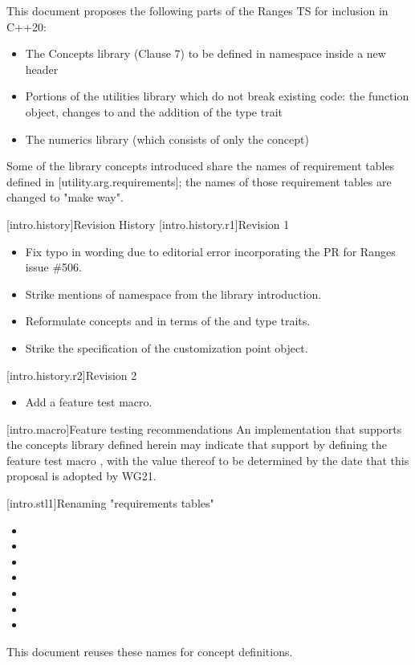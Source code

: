 This document proposes the following parts of the Ranges TS for inclusion in C++20:
\begin{itemize}
\item The Concepts library (Clause 7) to be defined in namespace  inside
  a new  header
\item Portions of the utilities library which do not break existing code: the
   function object, changes to   and the
  addition of the  type trait
\item The numerics library (which consists of only the
   concept)
\end{itemize}
Some of the library concepts introduced share the names of requirement tables
defined in [utility.arg.requirements]; the names of those requirement tables are
changed to "make way".

[intro.history]{Revision History}
[intro.history.r1]{Revision 1}
\begin{itemize}
\item Fix typo in  wording due to editorial error
  incorporating the PR for Ranges issue \#506.
\item Strike mentions of namespace  from the library introduction.
\item Reformulate concepts  and  in terms
  of the  and  type traits.
\item Strike the specification of the  customization point object.
\end{itemize}
[intro.history.r2]{Revision 2}
\begin{itemize}
\item Add a feature test macro.
\end{itemize}

[intro.macro]{Feature testing recommendations}
An implementation that supports the concepts library defined herein may indicate
that support by defining the feature test macro , with
the value thereof to be determined by the date that this proposal is adopted by
WG21.

[intro.stl1]{Renaming "requirements tables"}

\pnum
{}
\begin{itemize}
\item {}
\item {}
\item {}
\item {}
\item {}
\item {}
\item {}
\end{itemize}
This document reuses these names for concept definitions.

